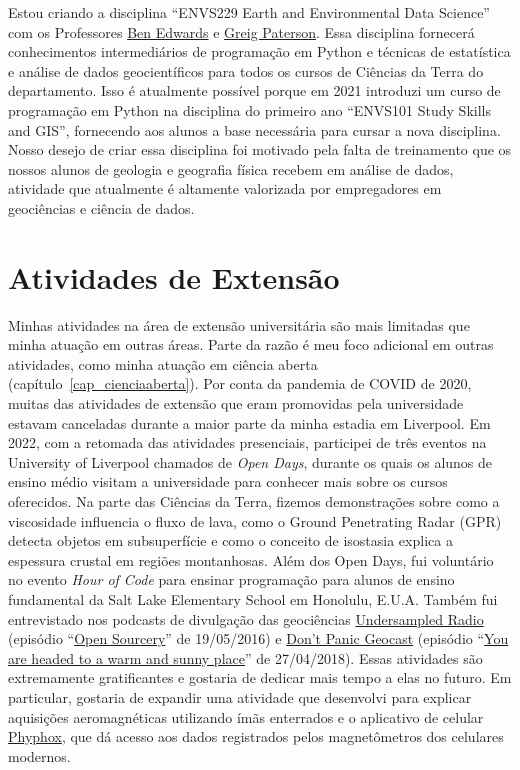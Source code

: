 \documentclass[10pt,a4paper,oneside]{book}
\begin{document}
Estou criando a disciplina ``ENVS229 Earth and Environmental Data Science'' com
os Professores \href{https://www.liverpool.ac.uk/environmental-sciences/staff/ben-edwards/}{Ben Edwards}
e \href{https://www.liverpool.ac.uk/environmental-sciences/staff/greig-paterson/}{Greig Paterson}.
Essa disciplina fornecerá conhecimentos intermediários de programação em Python
e técnicas de estatística e análise de dados geocientíficos para todos os
cursos de Ciências da Terra do departamento.
Isso é atualmente possível porque em 2021 introduzi um curso de programação em
Python na disciplina do primeiro ano ``ENVS101 Study Skills and GIS'',
fornecendo aos alunos a base necessária para cursar a nova disciplina.
Nosso desejo de criar essa disciplina foi motivado pela falta de treinamento
que os nossos alunos de geologia e geografia física recebem em análise de
dados, atividade que atualmente é altamente valorizada por empregadores em
geociências e ciência de dados.

\section{Atividades de Extensão}

Minhas atividades na área de extensão universitária são mais limitadas que
minha atuação em outras áreas.
Parte da razão é meu foco adicional em outras atividades, como minha atuação
em ciência aberta (capítulo~\ref{cap_cienciaaberta}).
Por conta da pandemia de COVID de 2020, muitas das atividades de extensão que
eram promovidas pela universidade estavam canceladas durante a maior parte da
minha estadia em Liverpool.
Em 2022, com a retomada das atividades presenciais, participei de três eventos
na University of Liverpool chamados de \textit{Open Days}, durante os quais
os alunos de ensino médio visitam a universidade para conhecer mais sobre os
cursos oferecidos.
Na parte das Ciências da Terra, fizemos demonstrações sobre como a viscosidade
influencia o fluxo de lava, como o Ground Penetrating Radar (GPR) detecta
objetos em subsuperfície e como o conceito de isostasia explica a espessura
crustal em regiões montanhosas.
Além dos Open Days, fui voluntário no evento \textit{Hour of Code} para ensinar
programação para alunos de ensino fundamental da Salt Lake Elementary School em
Honolulu, E.U.A.
Também fui entrevistado nos podcasts de divulgação das geociências
\href{https://undersampledrad.io}{Undersampled Radio}
(episódio ``\href{https://undersampledrad.io/home/2016/7/open-sourcery}{Open
Sourcery}'' de 19/05/2016)
e \href{https://www.dontpanicgeocast.com/166}{Don't Panic Geocast}
(episódio ``\href{https://www.dontpanicgeocast.com/166}{You are headed to a warm and sunny place}''
de 27/04/2018).
Essas atividades são extremamente gratificantes e gostaria de dedicar mais
tempo a elas no futuro.
Em particular, gostaria de expandir uma atividade que desenvolvi para explicar
aquisições aeromagnéticas utilizando ímãs enterrados e o aplicativo de celular
\href{https://phyphox.org/}{Phyphox}, que dá acesso aos dados registrados pelos
magnetômetros dos celulares modernos.
\end{document}
